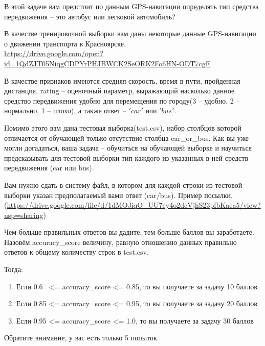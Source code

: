 
В этой задаче вам предстоит по данным GPS-навигации определять тип средства передвижения -- это автобус или легковой автомобиль?


В качестве тренировочной выборки вам даны некоторые данные GPS-навигации о движении транспорта в Красноярске.\\ \url{https://drive.google.com/open?id=1QdZJT05NiqgCDPYrPHJBWCK2SeORK2Fo6HN-ODT7cgE}

В качестве признаков имеются средняя скорость, время в пути, пройденная дистанция,  rating -- оценочный параметр, выражающий насколько данное средство передвижения удобно для перемещения по городу(3 -- удобно, 2 -- нормально, 1 -- плохо), а также ответ --  $'car'$ или $'bus'$.

Помимо этого вам дана тестовая выборка(test.csv), набор столбцов которой отличается от 
обучающей только отсутствие столбца car\_or\_bus. Как вы уже могли догадаться, ваша задача -- 
обучиться на обучающей выборке и научиться предсказывать для тестовой выборки тип каждого из 
указанных в ней средств передвижения (car или bus).




\outputfmtSection

Вам нужно сдать в систему файл, в котором для каждой строки из тестовой выборки указан предполагаемый вами ответ (car/bus). Пример посылки. (\url{https://drive.google.com/file/d/1dMOJiqO_UU7ey4o2dcVjhS23pfbKaea5/view?usp=sharing})

\markSection

Чем больше правильных ответов вы дадите, тем больше баллов вы заработаете. 
Назовём accuracy\_score величину, равную отношению данных правильно ответов к общему количеству строк в 
test.csv. 

Тогда:

\begin{enumerate}
    \item Если 0.6  <= accuracy\_score <= 0.85, то вы получаете за задачу 10 баллов
    \item Если 0.85 <= accuracy\_score <= 0.95, то вы получаете за задачу 20 баллов
    \item Если 0.95 <= accuracy\_score <= 1.0, то вы получаете за задачу 30 баллов
\end{enumerate}

Обратите внимание, у вас есть только 5 попыток.

